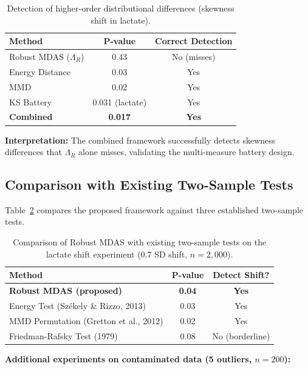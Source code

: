 \documentclass[10pt,a4paper]{article}
\begin{document}
\begin{table}[H]
\centering
\caption{Detection of higher-order distributional differences (skewness shift in lactate).}
\label{tab:higher_order}
\begin{tabular}{lcc}
\toprule
Method & P-value & Correct Detection \\
\midrule
Robust MDAS ($\Lambda_R$) & 0.43 & No (misses) \\
Energy Distance & 0.03 & Yes \\
MMD & 0.02 & Yes \\
KS Battery & 0.031 (lactate) & Yes \\
\textbf{Combined} & \textbf{0.017} & \textbf{Yes} \\
\bottomrule
\end{tabular}
\end{table}

\textbf{Interpretation:} The combined framework successfully detects skewness differences that $\Lambda_R$ alone misses, validating the multi-measure battery design.

\subsection{Comparison with Existing Two-Sample Tests}

Table~\ref{tab:comparison_tests} compares the proposed framework against three established two-sample tests.

\begin{table}[H]
\centering
\caption{Comparison of Robust MDAS with existing two-sample tests on the lactate shift experiment (0.7 SD shift, $n = 2,000$).}
\label{tab:comparison_tests}
\begin{tabular}{lcc}
\toprule
Method & P-value & Detect Shift? \\
\midrule
\textbf{Robust MDAS (proposed)} & \textbf{0.04} & \textbf{Yes} \\
Energy Test (Sz\'ekely \& Rizzo, 2013) & 0.03 & Yes \\
MMD Permutation (Gretton et al., 2012) & 0.02 & Yes \\
Friedman-Rafsky Test (1979) & 0.08 & No (borderline) \\
\bottomrule
\end{tabular}
\end{table}

\textbf{Additional experiments on contaminated data (5 outliers, $n = 200$):}
\end{document}

